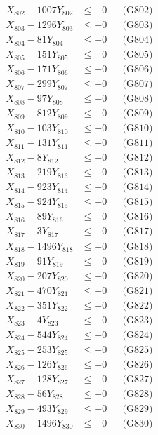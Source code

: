 \documentclass[a4paper,10pt]{article}
\begin{document}
{\begin{align}
X_{802} - 1007Y_{802} &\leq +0 && \text{(G802)} \\
X_{803} - 1296Y_{803} &\leq +0 && \text{(G803)} \\
X_{804} - 81Y_{804} &\leq +0 && \text{(G804)} \\
X_{805} - 151Y_{805} &\leq +0 && \text{(G805)} \\
X_{806} - 171Y_{806} &\leq +0 && \text{(G806)} \\
X_{807} - 299Y_{807} &\leq +0 && \text{(G807)} \\
X_{808} - 97Y_{808} &\leq +0 && \text{(G808)} \\
X_{809} - 812Y_{809} &\leq +0 && \text{(G809)} \\
X_{810} - 103Y_{810} &\leq +0 && \text{(G810)} \\
\allowbreak
X_{811} - 131Y_{811} &\leq +0 && \text{(G811)} \\
X_{812} - 8Y_{812} &\leq +0 && \text{(G812)} \\
X_{813} - 219Y_{813} &\leq +0 && \text{(G813)} \\
X_{814} - 923Y_{814} &\leq +0 && \text{(G814)} \\
X_{815} - 924Y_{815} &\leq +0 && \text{(G815)} \\
X_{816} - 89Y_{816} &\leq +0 && \text{(G816)} \\
X_{817} - 3Y_{817} &\leq +0 && \text{(G817)} \\
X_{818} - 1496Y_{818} &\leq +0 && \text{(G818)} \\
X_{819} - 91Y_{819} &\leq +0 && \text{(G819)} \\
X_{820} - 207Y_{820} &\leq +0 && \text{(G820)} \\
\allowbreak
X_{821} - 470Y_{821} &\leq +0 && \text{(G821)} \\
X_{822} - 351Y_{822} &\leq +0 && \text{(G822)} \\
X_{823} - 4Y_{823} &\leq +0 && \text{(G823)} \\
X_{824} - 544Y_{824} &\leq +0 && \text{(G824)} \\
X_{825} - 253Y_{825} &\leq +0 && \text{(G825)} \\
X_{826} - 126Y_{826} &\leq +0 && \text{(G826)} \\
X_{827} - 128Y_{827} &\leq +0 && \text{(G827)} \\
X_{828} - 56Y_{828} &\leq +0 && \text{(G828)} \\
X_{829} - 493Y_{829} &\leq +0 && \text{(G829)} \\
X_{830} - 1496Y_{830} &\leq +0 && \text{(G830)} \\

\end{align}}
\end{document}
